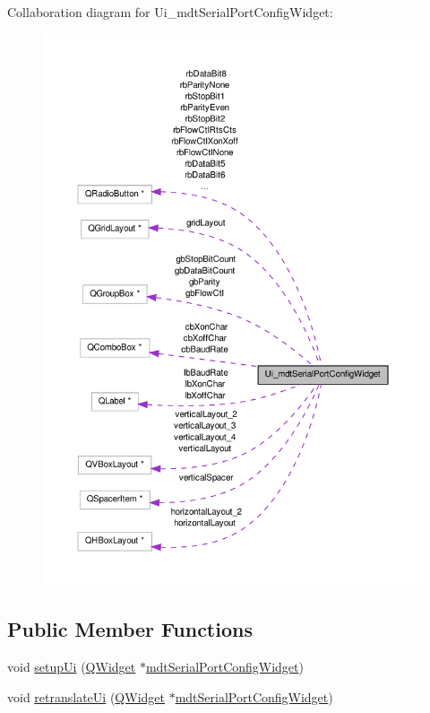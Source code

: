 Collaboration diagram for Ui\-\_\-mdt\-Serial\-Port\-Config\-Widget\-:\nopagebreak
\begin{figure}[H]
\begin{center}
\leavevmode
\includegraphics[width=350pt]{class_ui__mdt_serial_port_config_widget__coll__graph}
\end{center}
\end{figure}
\subsection*{Public Member Functions}
\begin{DoxyCompactItemize}
\item 
void \hyperlink{class_ui__mdt_serial_port_config_widget_a7bc09917cb653acb79c8ddeee96b5a99}{setup\-Ui} (\hyperlink{class_q_widget}{Q\-Widget} $\ast$\hyperlink{classmdt_serial_port_config_widget}{mdt\-Serial\-Port\-Config\-Widget})
\item 
void \hyperlink{class_ui__mdt_serial_port_config_widget_afdc8635645d12884a6b81ab0217fbdd2}{retranslate\-Ui} (\hyperlink{class_q_widget}{Q\-Widget} $\ast$\hyperlink{classmdt_serial_port_config_widget}{mdt\-Serial\-Port\-Config\-Widget})
\end{DoxyCompactItemize}
